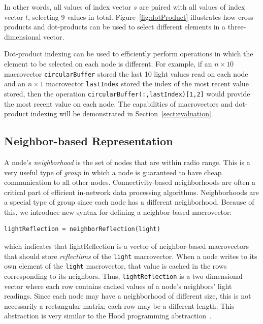 In other words, all values of index vector $s$ are paired with all values of
index vector $t$, selecting 9 values in total.  Figure~\ref{fig:dotProduct}
illustrates how cross-products and dot-products can be used to select
different elements in a three-dimensional vector.

Dot-product indexing can be used to efficiently perform operations in
which the element to be selected on each node is different.  For
example, if an $n \times 10$ macrovector {\tt circularBuffer} stored
the last 10 light values read on each node and an $n \times 1$
macrovector {\tt lastIndex} stored the index of the most recent value
stored, then the operation {\tt circularBuffer(:,lastIndex)[1,2]}
would provide the most recent value on each node. The capabilities of
macrovectors and dot-product indexing will be demonstrated
in Section~\ref{sect:evaluation}.

\subsection{Neighbor-based Representation} \label{sect:neighborRepresentation}
A node's {\em neighborhood} is the set of nodes that are within radio
range.  This is a very useful type of {\em group} in which a node is
guaranteed to have cheap communication to all other nodes. Connectivity-based neighborhoods are often
a critical part of efficient in-network data processing algorithms.
Neighborhoods are a special type of group since each node has a
different neighborhood.
Because of this, we introduce new syntax for defining a
neighbor-based macrovector:
\vspace{.1in}
\begin{center}
\ttfamily\small
\begin{verbatim}
lightReflection = neighborReflection(light)
\end{verbatim}
\end{center}
\vspace{.1in} 
\noindent which indicates that lightReflection is a vector of
neighbor-based macrovectors that should store {\em reflections} 
of the {\tt light} macrovector. When a node writes to its own element
of the {\tt light} macrovector, that value is cached in the rows
corresponding to its neighbors.  Thus, {\tt lightReflection} is a two
dimensional vector where each row contains cached values of a node's
neighbors' light readings. Since each node may have a neighborhood of
different size, this is not necessarily a rectangular matrix; each row may
be a different length.  This abstraction is very similar to the Hood
programming abstraction~\cite{Whitehousea}.

